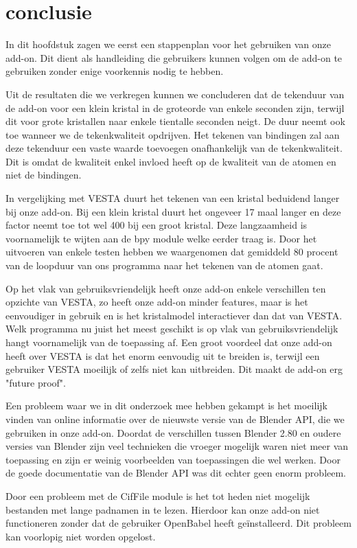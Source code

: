\section{conclusie}
In dit hoofdstuk zagen we eerst een stappenplan voor het gebruiken van onze add-on. Dit dient als handleiding die gebruikers kunnen volgen om de add-on te gebruiken zonder enige voorkennis nodig te hebben. 
\par
Uit de resultaten die we verkregen kunnen we concluderen dat de tekenduur van de add-on voor een klein kristal in de groteorde van enkele seconden zijn, terwijl dit voor grote kristallen naar enkele tientalle seconden neigt. De duur neemt ook toe wanneer we de tekenkwaliteit opdrijven. Het tekenen van bindingen zal aan deze tekenduur een vaste waarde toevoegen onafhankelijk van de tekenkwaliteit. Dit is omdat de kwaliteit enkel invloed heeft op de kwaliteit van de atomen en niet de bindingen.
\par    
In vergelijking met VESTA duurt het tekenen van een kristal beduidend langer bij onze add-on. Bij een klein kristal duurt het ongeveer 17 maal langer en deze factor neemt toe tot wel 400 bij een groot kristal. Deze langzaamheid is voornamelijk te wijten aan de bpy module welke eerder traag is. Door het uitvoeren van enkele testen hebben we waargenomen dat gemiddeld 80 procent van de loopduur van ons programma naar het tekenen van de atomen gaat. 
\par
Op het vlak van gebruiksvriendelijk heeft onze add-on enkele verschillen ten opzichte van VESTA, zo heeft onze add-on minder features, maar is het eenvoudiger in gebruik en is het kristalmodel interactiever dan dat van VESTA. Welk programma nu juist het meest geschikt is op vlak van gebruiksvriendelijk hangt voornamelijk van de toepassing af. Een groot voordeel dat onze add-on heeft over VESTA is dat het enorm eenvoudig uit te breiden is, terwijl een gebruiker VESTA moeilijk of zelfs niet kan uitbreiden. Dit maakt de add-on erg "future proof".
\par 
Een probleem waar we in dit onderzoek mee hebben gekampt is het moeilijk vinden van online informatie over de nieuwste versie van de Blender API, die we gebruiken in onze add-on. Doordat de verschillen tussen Blender 2.80 en oudere versies van Blender zijn veel technieken die vroeger mogelijk waren niet meer van toepassing en zijn er weinig voorbeelden van toepassingen die wel werken. Door de goede documentatie van de Blender API was dit echter geen enorm probleem.
\par
Door een probleem met de CifFile module is het tot heden niet mogelijk bestanden met lange padnamen in te lezen. Hierdoor kan onze add-on niet functioneren zonder dat de gebruiker OpenBabel heeft geïnstalleerd. Dit probleem kan voorlopig niet worden opgelost. 
